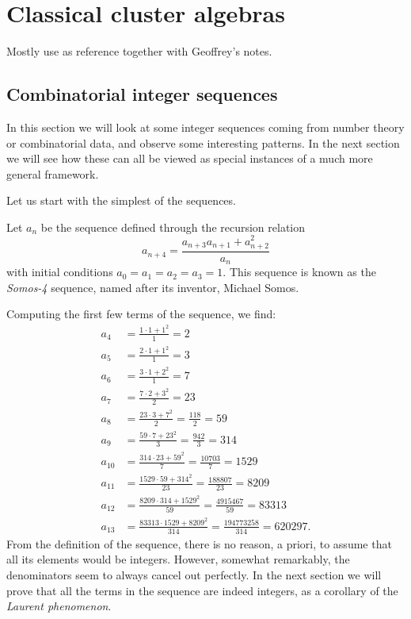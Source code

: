 \section{Classical cluster algebras}
Mostly use \cite{FominWilliams2021IntroductionCA_1-3} as reference together with
Geoffrey's notes.

\subsection{Combinatorial integer sequences}

In this section we will look at some integer sequences coming from number theory or
combinatorial data, and observe some interesting patterns. In the next section we will
see how these can all be viewed as special instances of a much more general framework.

Let us start with the simplest of the sequences.
\begin{definition}
	Let $a_n$ be the sequence defined through the recursion relation
	\begin{equation}
		\label{eq:somos_4}
		a_{n+4} = \frac{a_{n+3}a_{n+1}+ a_{n+2}^2}{a_n}
	\end{equation}
	with initial conditions $a_0 = a_1 = a_2 = a_3 = 1$. This sequence is known as the \emph{Somos-4} sequence, named after its inventor, Michael Somos.
\end{definition}
Computing the first few terms of the sequence, we find:
\begin{align*}
	a_4    & = \frac{1 \cdot 1 + 1^2}{1} = 2                                           \\
	a_5    & = \frac{2 \cdot 1 + 1^2}{1} = 3                                           \\
	a_6    & = \frac{3 \cdot 1 + 2^2}{1} = 7                                           \\
	a_7    & = \frac{7 \cdot 2 + 3^2}{2} = 23                                          \\
	a_8    & = \frac{23 \cdot 3 + 7^2}{2} = \frac{118}{2} = 59                         \\
	a_9    & = \frac{59 \cdot 7 + 23^2}{3} = \frac{942}{3} = 314                       \\
	a_{10} & = \frac{314 \cdot 23 + 59^2}{7} = \frac{10703}{7} = 1529                  \\
	a_{11} & = \frac{1529 \cdot 59 + 314^2}{23} = \frac{188807}{23} = 8209             \\
	a_{12} & = \frac{8209 \cdot 314 + 1529^2}{59} = \frac{4915467}{59} = 83313         \\
	a_{13} & = \frac{83313 \cdot 1529 + 8209^2}{314} = \frac{194773258}{314} = 620297.
\end{align*}
From the definition of the sequence, there is no reason, a priori, to assume that all its elements would be integers. However, somewhat remarkably, the denominators seem to always cancel out perfectly. In the next section we will prove that all the terms in the sequence are indeed integers,
as a corollary of the \emph{Laurent phenomenon}.

